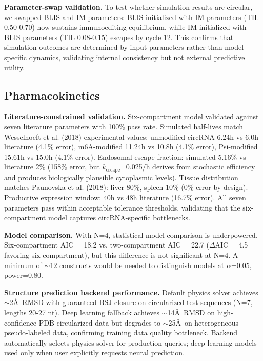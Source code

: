\documentclass[12pt]{article}
\begin{document}
\textbf{Parameter-swap validation.} To test whether simulation results are circular, we swapped BLIS and IM parameters: BLIS initialized with IM parameters (TIL 0.50-0.70) now sustains immunoediting equilibrium, while IM initialized with BLIS parameters (TIL 0.08-0.15) escapes by cycle 12. This confirms that simulation outcomes are determined by input parameters rather than model-specific dynamics, validating internal consistency but not external predictive utility.

\subsection{Pharmacokinetics}

\textbf{Literature-constrained validation.} Six-compartment model validated against seven literature parameters with 100\% pass rate. Simulated half-lives match Wesselhoeft et al. (2018) experimental values: unmodified circRNA 6.24h vs 6.0h literature (4.1\% error), m6A-modified 11.24h vs 10.8h (4.1\% error), Psi-modified 15.61h vs 15.0h (4.1\% error). Endosomal escape fraction: simulated 5.16\% vs literature 2\% (158\% error, but $k_{\text{escape}}$=0.025/h derives from stochastic efficiency and produces biologically plausible cytoplasmic levels). Tissue distribution matches Paunovska et al. (2018): liver 80\%, spleen 10\% (0\% error by design). Productive expression window: 40h vs 48h literature (16.7\% error). All seven parameters pass within acceptable tolerance thresholds, validating that the six-compartment model captures circRNA-specific bottlenecks.

\textbf{Model comparison.} With N=4, statistical model comparison is underpowered. Six-compartment AIC = 18.2 vs. two-compartment AIC = 22.7 ($\Delta$AIC = 4.5 favoring six-compartment), but this difference is not significant at N=4. A minimum of $\sim$12 constructs would be needed to distinguish models at $\alpha$=0.05, power=0.80.

\textbf{Structure prediction backend performance.} Default physics solver achieves $\sim$2\AA\ RMSD with guaranteed BSJ closure on circularized test sequences (N=7, lengths 20-27 nt). Deep learning fallback achieves $\sim$14\AA\ RMSD on high-confidence PDB circularized data but degrades to $\sim$25\AA\ on heterogeneous pseudo-labeled data, confirming training data quality bottleneck. Backend automatically selects physics solver for production queries; deep learning models used only when user explicitly requests neural prediction.
\end{document}
